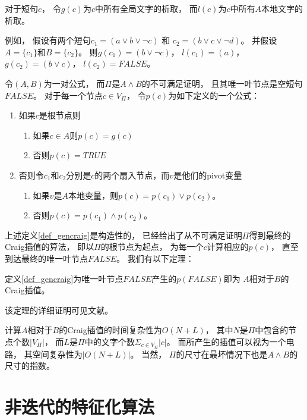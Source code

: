 对于短句$c$，
令$g(c)$为$c$中所有全局文字的析取，
而$l(c)$为$c$中所有$A$本地文字的析取。

例如，
假设有两个短句$c_1=(a\vee b\vee\neg c)$ 和
$c_2=(b\vee c\vee\neg d)$。
并假设$A=\{c_1\}$和$B=\{c_2\}$。
则$g(c_1)=(b\vee\neg c)$，
$l(c_1)=(a)$，
$g(c_2)=(b\vee c)$，
$l(c_2)=FALSE$。


\begin{definition}\label{def_gencraig}
令$(A,B)$为一对公式，
而$\Pi$是$A\wedge B$的不可满足证明，
且其唯一叶节点是空短句$FALSE$。
对于每一个节点$c\in V_{\Pi}$，
令$p(c)$为如下定义的一个公式：
\begin{enumerate}
\item 如果$c$是根节点则
  \begin{enumerate}
    \item 如果$c\in A$则$p(c)=g(c)$
    \item 否则$p(c)=TRUE$
  \end{enumerate}
\item 否则令$c_1$和$c_2$分别是$c$的两个扇入节点，而$v$是他们的pivot变量
  \begin{enumerate}
    \item 如果$v$是$A$本地变量，则$p(c)=p(c_1)\vee p(c_2)$。
    \item 否则$p(c)=p(c_1)\wedge p(c_2)$。
  \end{enumerate}
\end{enumerate}
\end{definition}

上述定义\ref{def_gencraig}是构造性的，
已经给出了从不可满足证明$\Pi$得到最终的Craig插值的算法，
即以$\Pi$的根节点为起点，
为每一个$c$计算相应的$p(c)$，
直至到达最终的唯一叶节点$FALSE$。
我们有以下定理：

\begin{theorem}
定义\ref{def_gencraig}为唯一叶节点$FALSE$产生的$p(FALSE)$即为
$A$相对于$B$的Craig插值。
\end{theorem}

该定理的详细证明可见文献。

计算$A$相对于$B$的Craig插值的时间复杂性为$O(N+L)$，
其中$N$是$\Pi$中包含的节点个数$|V_{\Pi}|$，
而$L$是$\Pi$中的文字个数$\Sigma_{c\in V_{\Pi}}|c|$。
而所产生的插值可以视为一个电路，
其空间复杂性为$|O(N+L)|$。
当然，
$\Pi$的尺寸在最坏情况下也是$A\wedge B$的尺寸的指数。



\section{非迭代的特征化算法}\label{sec_craigchar}


